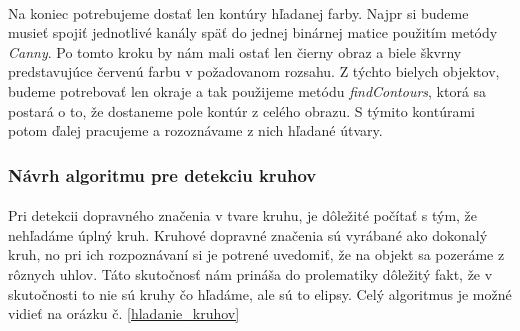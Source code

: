 \documentclass[12pt]{article}
\begin{document}
\paragraph{}
Na koniec potrebujeme dostať len kontúry hľadanej farby. 
Najpr si budeme musieť spojiť jednotlivé kanály späť do jednej binárnej matice použitím metódy \emph{Canny}. 
Po tomto kroku by nám mali ostať len čierny obraz a biele škvrny predstavujúce červenú farbu v požadovanom rozsahu.
Z týchto bielych objektov, budeme potrebovať len okraje a tak použijeme metódu \emph{findContours}, ktorá sa postará o to, že dostaneme pole kontúr z celého obrazu.
S týmito kontúrami potom ďalej pracujeme a rozoznávame z nich hľadané útvary.
\subsubsection{Návrh algoritmu pre detekciu kruhov}
\paragraph{}
Pri detekcii dopravného značenia v tvare kruhu, je dôležité počítať s tým, že nehľadáme úplný kruh. Kruhové dopravné značenia sú vyrábané ako dokonalý kruh,
no pri ich rozpoznávaní si je potrené uvedomiť, že na objekt sa pozeráme z rôznych uhlov. Táto skutočnosť nám prináša do prolematiky dôležitý fakt,
že v skutočnosti to nie sú kruhy čo hľadáme, ale sú to elipsy. Celý algoritmus je možné vidieť na orázku č. \ref{hladanie_kruhov}
\end{document}
